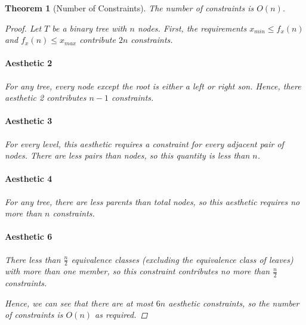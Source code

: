 \documentclass[11pt]{report}
\newtheorem{theorem}{Theorem}[section]
\begin{document}
\begin{theorem}[Number of Constraints]
    The number of constraints is $O(n)$.
    
    \begin{proof}
        Let $T$ be a binary tree with $n$ nodes. First, the requirements $x_{min} \leq f_x(n)$ and $f_x(n) \leq x_{max}$ contribute $2n$ constraints.
        
        \paragraph{Aesthetic 2} For any tree, every node except the root is either a left or right son. Hence, there aesthetic 2 contributes $n - 1$ constraints.
        
        \paragraph{Aesthetic 3} For every level, this aesthetic requires a constraint for every adjacent pair of nodes. There are less pairs than nodes, so this quantity is less than $n$.
        
        \paragraph{Aesthetic 4} For any tree, there are less parents than total nodes, so this aesthetic requires no more than $n$ constraints.
        
        \paragraph{Aesthetic 6} There less than $\frac{n}{2}$ equivalence classes (excluding the equivalence class of leaves) with more than one member, so this constraint contributes no more than $\frac{n}{2}$ constraints.
        
        \bigskip
        
        Hence, we can see that there are at most $6n$ aesthetic constraints, so the number of constraints is $O(n)$ as required.
    \end{proof}
\end{theorem}
\end{document}

